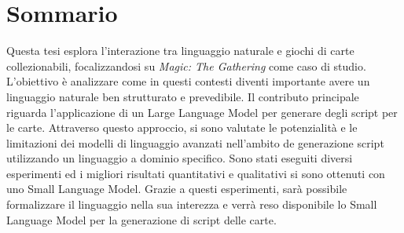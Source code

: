 \chapter*{Sommario} %

Questa tesi esplora l'interazione tra linguaggio naturale e giochi di carte collezionabili, focalizzandosi su \emph{Magic: The Gathering} come caso di studio. L'obiettivo è analizzare come in questi contesti diventi importante avere un linguaggio naturale ben strutturato e prevedibile. Il contributo principale riguarda l'applicazione di un Large Language Model per generare degli script per le carte. Attraverso questo approccio, si sono valutate le potenzialità e le limitazioni dei modelli di linguaggio avanzati nell'ambito de generazione script utilizzando un linguaggio a dominio specifico. Sono stati eseguiti diversi esperimenti ed i migliori risultati quantitativi e qualitativi si sono ottenuti con uno Small Language Model.
Grazie a questi esperimenti, sarà possibile formalizzare il linguaggio nella sua interezza e verrà reso disponibile lo Small Language Model per la generazione di script delle carte.